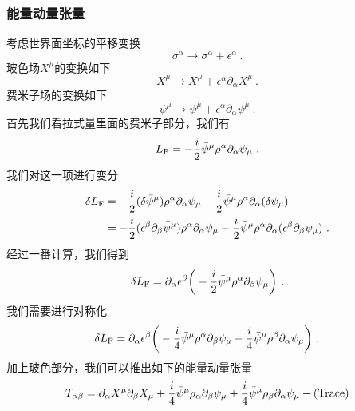\subsubsection{能量动量张量}
考虑世界面坐标的平移变换
\begin{equation}
\sigma^\alpha \rightarrow \sigma^\alpha + \epsilon^\alpha~.
\end{equation}
玻色场$X^\mu$的变换如下
\begin{equation}
X^\mu \rightarrow X^\mu + \epsilon^\alpha \partial_\alpha X^\mu ~.
\end{equation}
费米子场的变换如下
\begin{equation}
\psi^\mu \rightarrow \psi^\mu + \epsilon^\alpha \partial_\alpha \psi^\mu ~.
\end{equation}
首先我们看拉式量里面的费米子部分，我们有
\begin{equation}
L_{\rm F} = - \frac{i}{2} \bar\psi^\mu \rho^\alpha \partial_\alpha \psi_\mu ~.
\end{equation}
我们对这一项进行变分
\begin{equation}
\begin{aligned}
\delta L_{\rm F} & = - \frac{i}{2} (\delta \bar\psi^\mu) \rho^\alpha \partial_\alpha \psi_\mu - \frac{i}{2} \bar\psi^\mu \rho^\alpha \partial_\alpha (\delta \psi_\mu) \\
& = -\frac{i}{2} (\epsilon^\beta\partial_\beta\bar\psi^\mu) \rho^\alpha \partial_\alpha \psi_\mu - \frac{i}{2} \bar\psi^\mu \rho^\alpha \partial_\alpha (\epsilon^\beta\partial_\beta \psi_\mu) ~.
\end{aligned}
\end{equation}
经过一番计算，我们得到
\begin{equation}
\delta L_{\rm F} = \partial_\alpha \epsilon^\beta \bigg( - \frac{i}{2} \bar\psi^\mu \rho^\alpha \partial_\beta \psi_\mu \bigg)~.
\end{equation}
我们需要进行对称化
\begin{equation}
\delta L_{\rm F} = \partial_\alpha \epsilon^\beta \bigg(    -\frac{i}{4} \bar\psi^\mu \rho^\alpha \partial_\beta \psi_\mu - \frac{i}{4} \bar \psi^\mu \rho^\beta\partial_\alpha \psi_\mu  \bigg)~.
\end{equation}
加上玻色部分，我们可以推出如下的能量动量张量
\begin{equation}
T_{\alpha\beta} = \partial_\alpha X^\mu \partial_\beta X_\mu + \frac{i}{4} \bar\psi^\mu \rho_\alpha \partial_\beta \psi_\mu + \frac{i}{4} \bar \psi^\mu \rho_\beta\partial_\alpha\psi_\mu - {\rm (Trace)}
\end{equation}
